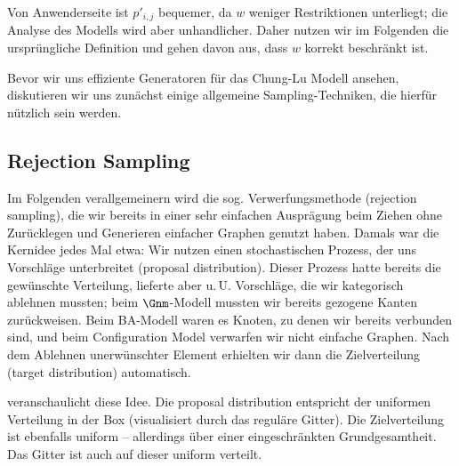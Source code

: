 Von Anwenderseite ist $p'_{i,j}$ bequemer, da $w$ weniger Restriktionen unterliegt;
die Analyse des Modells wird aber unhandlicher.
Daher nutzen wir im Folgenden die ursprüngliche Definition und gehen davon aus, dass $w$ korrekt beschränkt ist.

Bevor wir uns effiziente Generatoren für das Chung-Lu Modell ansehen, diskutieren wir uns zunächst einige allgemeine Sampling-Techniken, die hierfür nützlich sein werden.

\subsection{Rejection Sampling}
Im Folgenden verallgemeinern wird die sog. Verwerfungsmethode (rejection sampling), die wir bereits in einer sehr einfachen Ausprägung beim Ziehen ohne Zurücklegen und Generieren einfacher Graphen genutzt haben.
Damals war die Kernidee jedes Mal etwa:
Wir nutzen einen stochastischen Prozess, der uns Vorschläge unterbreitet (proposal distribution).
Dieser Prozess hatte bereits die gewünschte Verteilung, lieferte aber u.\,U. Vorschläge, die wir kategorisch ablehnen mussten;
beim $\Gnm$-Modell mussten wir bereits gezogene Kanten zurückweisen.
Beim BA-Modell waren es Knoten, zu denen wir bereits verbunden sind, und beim Configuration Model verwarfen wir nicht einfache Graphen.
Nach dem Ablehnen unerwünschter Element erhielten wir dann die Zielverteilung (target distribution) automatisch.

 veranschaulicht diese Idee.
Die proposal distribution entspricht der uniformen Verteilung in der Box (visualisiert durch das reguläre Gitter).
Die Zielverteilung ist ebenfalls uniform -- allerdings über einer eingeschränkten Grundgesamtheit.
Das Gitter ist auch auf dieser uniform verteilt.

